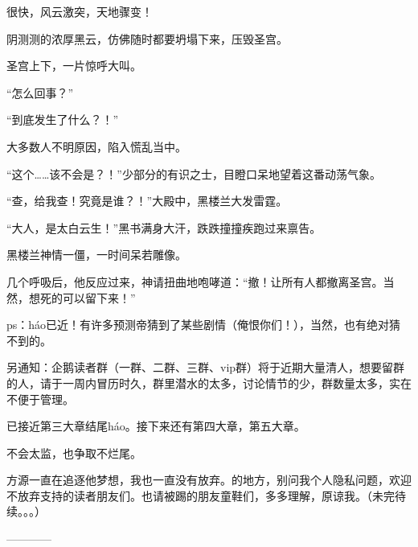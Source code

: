 \begin{this_body}
很快，风云激突，天地骤变！

阴测测的浓厚黑云，仿佛随时都要坍塌下来，压毁圣宫。

圣宫上下，一片惊呼大叫。

“怎么回事？”

“到底发生了什么？！”

大多数人不明原因，陷入慌乱当中。

“这个……该不会是？！”少部分的有识之士，目瞪口呆地望着这番动荡气象。

“查，给我查！究竟是谁？！”大殿中，黑楼兰大发雷霆。

“大人，是太白云生！”黑书满身大汗，跌跌撞撞疾跑过来禀告。

黑楼兰神情一僵，一时间呆若雕像。

几个呼吸后，他反应过来，神请扭曲地咆哮道：“撤！让所有人都撤离圣宫。当然，想死的可以留下来！”

ps：háo已近！有许多预测帝猜到了某些剧情（俺恨你们！），当然，也有绝对猜不到的。

另通知：企鹅读者群（一群、二群、三群、vip群）将于近期大量清人，想要留群的人，请于一周内冒历时久，群里潜水的太多，讨论情节的少，群数量太多，实在不便于管理。

已接近第三大章结尾háo。接下来还有第四大章，第五大章。

不会太监，也争取不烂尾。

方源一直在追逐他梦想，我也一直没有放弃。的地方，别问我个人隐私问题，欢迎不放弃支持的读者朋友们。也请被踢的朋友童鞋们，多多理解，原谅我。（未完待续。。。）

------------

\end{this_body}

